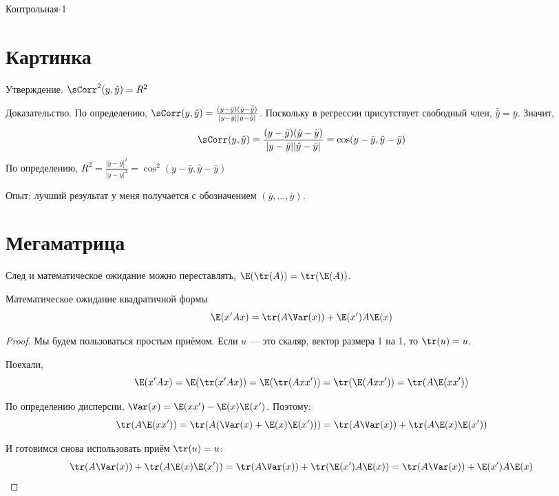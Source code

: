 \documentclass[pdftex,12pt,a4paper]{article}
\def \hy{\hat{y}}
\begin{document}
Контрольная-1

\section{Картинка}


Утверждение. $\sCorr^2(y,\hy)=R^2$

Доказательство. По определению, $\sCorr(y,\hy)=\frac{(y-\bar{y})(\hy-\bar{\hy})}{|y-\bar{y}||\hy-\bar{\hy}|}$. Поскольку в регрессии присутствует свободный член, $\bar{\hy}=\bar{y}$. Значит, 
\begin{equation}
\sCorr(y,\hy)=\frac{(y-\bar{y})(\hy-\bar{y})}{|y-\bar{y}||\hy-\bar{y}|}=\cos(y-\bar{y},\hy-\bar{y})
\end{equation}
По определению, $R^2=\frac{|\hy-\bar{y}|^2}{|y-\bar{y}|^2}=\cos^2(y-\bar{y},\hy-\bar{y})$



Опыт: лучший результат у меня получается с обозначением $(\bar{y},\ldots,\bar{y})$.


\section{Мегаматрица}
 
\begin{theorem}
След и математическое ожидание можно переставлять, $\E(\tr(A))=\tr(\E(A))$.
\end{theorem} 

\begin{theorem}
Математическое ожидание квадратичной формы
\begin{equation}
\E(x'Ax)=\tr(A\Var(x))+\E(x')A\E(x)
\end{equation}
\end{theorem}
\begin{proof}
Мы будем пользоваться простым приёмом. Если $u$ --- это скаляр, вектор размера 1 на 1, то $\tr(u)=u$.

Поехали,
\begin{equation}
\E(x'Ax)=\E(\tr(x'Ax))=\E(\tr(Axx'))=\tr(\E(Axx'))=\tr(A\E(xx'))
\end{equation}

По определению дисперсии, $\Var(x)=\E(xx')-\E(x)\E(x')$. Поэтому:
\begin{equation}
\tr(A\E(xx'))=\tr(A(\Var(x)+\E(x)\E(x')))=\tr(A\Var(x))+\tr(A\E(x)\E(x'))
\end{equation}

И готовимся снова использовать приём $\tr(u)=u$:
\begin{equation}
\tr(A\Var(x))+\tr(A\E(x)\E(x'))=\tr(A\Var(x))+\tr(\E(x')A\E(x))=
\tr(A\Var(x))+\E(x')A\E(x)
\end{equation}

\end{proof}
\end{document}

